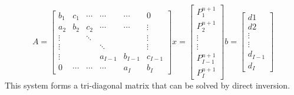 \documentclass[11pt,letterpaper,titlepage]{article}
\begin{document}
\begin{equation*}
A=
\begin{bmatrix}
b_1    & c_1     & \cdots & \cdots & \cdots & 0      \\
a_2    & b_2     & c_2    & \cdots & \cdots & \vdots \\
\vdots &         & \ddots &        &        & \vdots \\
\vdots &         &        & \ddots &        & \vdots \\
\vdots &         &        &a_{I-1} &b_{I-1} &c_{I-1}  \\
0      & \cdots  & \cdots & \cdots & a_I    & b_I 
\end{bmatrix}
x=
\begin{bmatrix}
P_1^{n+1} \\
P_2^{n+1} \\
\vdots \\
\vdots \\
P_{I-1}^{n+1} \\
P_I^{n+1} 
\end{bmatrix}
b=
\begin{bmatrix}
d1 \\
d2 \\
\vdots \\
\vdots \\
d_{I-1}\\
d_I
\end{bmatrix}
\end{equation*}
\newline
This system forms a tri-diagonal matrix that can be solved by direct inversion.                




















\newpage
{}
\end{document}
